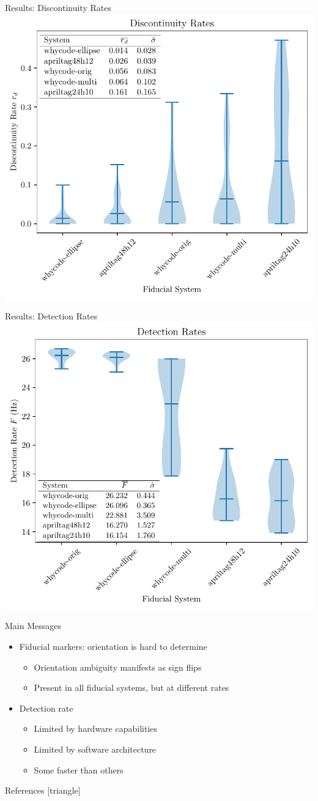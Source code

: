 \documentclass[aspectratio=169]{beamer}
\begin{document}
\begin{frame}{Results: Discontinuity Rates}
    \centering
    \includegraphics[width=0.6\linewidth]{./images/violin_plot_five_member}
\end{frame}

\begin{frame}{Results: Detection Rates}
    \centering
    \includegraphics[width=0.6\linewidth]{./images/violin_plot_speed_five_member}
\end{frame}

\begin{frame}{Main Messages}
	\begin{itemize}
		\item Fiducial markers: orientation is hard to determine
		\begin{itemize}
			\item Orientation ambiguity manifests as sign flips
			\item Present in all fiducial systems, but at different rates
		\end{itemize}
		\item Detection rate
		\begin{itemize}
			\item Limited by hardware capabilities
			\item Limited by software architecture
			\item Some faster than others
		\end{itemize}
	\end{itemize}
\end{frame}

\begin{frame}{References}
	[triangle]
	
	
\end{frame}
\end{document}
